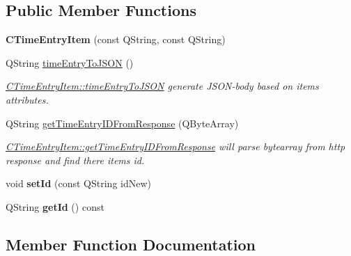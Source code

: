 \subsection*{Public Member Functions}
\begin{DoxyCompactItemize}
\item 
\mbox{\label{classCTimeEntryItem_abb2fcea14a59d2d78b50a3e0a6bf5a06}} 
{\bfseries C\+Time\+Entry\+Item} (const Q\+String, const Q\+String)
\item 
Q\+String \hyperlink{classCTimeEntryItem_acc7b42acd707bb21357f2ea81cc414a2}{time\+Entry\+To\+J\+S\+ON} ()
\begin{DoxyCompactList}\small\item\em \hyperlink{classCTimeEntryItem_acc7b42acd707bb21357f2ea81cc414a2}{C\+Time\+Entry\+Item\+::time\+Entry\+To\+J\+S\+ON} generate J\+S\+O\+N-\/body based on item\textquotesingle{}s attributes. \end{DoxyCompactList}\item 
Q\+String \hyperlink{classCTimeEntryItem_a1c2c26c28875293288a254bfea367f71}{get\+Time\+Entry\+I\+D\+From\+Response} (Q\+Byte\+Array)
\begin{DoxyCompactList}\small\item\em \hyperlink{classCTimeEntryItem_a1c2c26c28875293288a254bfea367f71}{C\+Time\+Entry\+Item\+::get\+Time\+Entry\+I\+D\+From\+Response} will parse bytearray from http response and find there item\textquotesingle{}s id. \end{DoxyCompactList}\item 
\mbox{\label{classCTimeEntryItem_a58ef4b5b516387b1492b5786fafaa6d2}} 
void {\bfseries set\+Id} (const Q\+String id\+New)
\item 
\mbox{\label{classCTimeEntryItem_ac0052afa3c731154ddce67befde71e2d}} 
Q\+String {\bfseries get\+Id} () const
\end{DoxyCompactItemize}


\subsection{Member Function Documentation}
\mbox{\label{classCTimeEntryItem_a1c2c26c28875293288a254bfea367f71}} 
